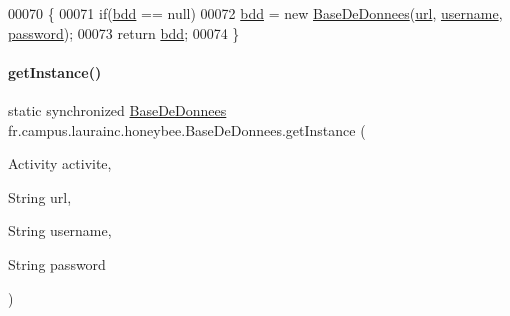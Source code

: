 \begin{DoxyCode}
00070     \{
00071         \textcolor{keywordflow}{if}(\hyperlink{classfr_1_1campus_1_1laurainc_1_1honeybee_1_1_base_de_donnees_a6afcd3f4c69f15afa0c675a848bf97a7}{bdd} == null)
00072             \hyperlink{classfr_1_1campus_1_1laurainc_1_1honeybee_1_1_base_de_donnees_a6afcd3f4c69f15afa0c675a848bf97a7}{bdd} = \textcolor{keyword}{new} \hyperlink{classfr_1_1campus_1_1laurainc_1_1honeybee_1_1_base_de_donnees_ac4d0c514f439b3a19dc35c159955373a}{BaseDeDonnees}(\hyperlink{classfr_1_1campus_1_1laurainc_1_1honeybee_1_1_base_de_donnees_ad1d04b4da375002e91d8370b9d19918e}{url}, \hyperlink{classfr_1_1campus_1_1laurainc_1_1honeybee_1_1_base_de_donnees_a7d1662e10f11f740155774b625ed1a87}{username}, 
      \hyperlink{classfr_1_1campus_1_1laurainc_1_1honeybee_1_1_base_de_donnees_af1bb604a666a7eee9edd93b6cafaf064}{password});
00073         \textcolor{keywordflow}{return} \hyperlink{classfr_1_1campus_1_1laurainc_1_1honeybee_1_1_base_de_donnees_a6afcd3f4c69f15afa0c675a848bf97a7}{bdd};
00074     \}
\end{DoxyCode}
\mbox{\label{classfr_1_1campus_1_1laurainc_1_1honeybee_1_1_base_de_donnees_a8dd37561ed70a74841590d9206248d9b}} 
\paragraph{\texorpdfstring{get\+Instance()}{getInstance()}\hspace{0.1cm}{\footnotesize\ttfamily [4/4]}}
{\footnotesize\ttfamily static synchronized \hyperlink{classfr_1_1campus_1_1laurainc_1_1honeybee_1_1_base_de_donnees}{Base\+De\+Donnees} fr.\+campus.\+laurainc.\+honeybee.\+Base\+De\+Donnees.\+get\+Instance (\begin{DoxyParamCaption}\item[{Activity}]{activite,  }\item[{String}]{url,  }\item[{String}]{username,  }\item[{String}]{password }\end{DoxyParamCaption})\hspace{0.3cm}{\ttfamily [static]}}



